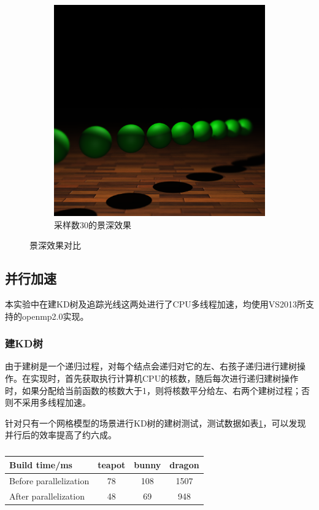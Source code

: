 \begin{figure}
\begin{subfigure}{0.45\textwidth}
        \includegraphics[width=\textwidth]{./img/dop.png}
        \caption{采样数30的景深效果}
    \end{subfigure}
    \caption{景深效果对比}
    \label{fig:dop}
\end{figure}

\subsection {并行加速}
本实验中在建KD树及追踪光线这两处进行了CPU多线程加速，均使用VS2013所支持的openmp2.0实现。
\subsubsection {建KD树}
由于建树是一个递归过程，对每个结点会递归对它的左、右孩子递归进行建树操作。在实现时，首先获取执行计算机CPU的核数，随后每次进行递归建树操作时，如果分配给当前函数的核数大于1，则将核数平分给左、右两个建树过程；否则不采用多线程加速。

针对只有一个网格模型的场景进行KD树的建树测试，测试数据如表\ref{table:parallel_build}，可以发现并行后的效率提高了约六成。\\
\begin{table}
    \centering
    \begin{tabular}{l c c c}
    Build time/ms & teapot & bunny & dragon\\
    \hline
    Before parallelization & 78 & 108 & 1507\\
    After parallelization & 48 & 69 & 948\\
    \end{tabular}
    \caption{}
    \label{table:parallel_build}
\end{table}
